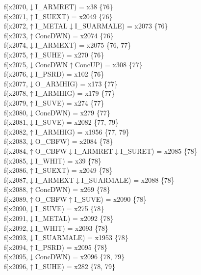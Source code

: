 f(x2070,$\downarrow$I\_ARMRET) = x38 \{76\} \\  
f(x2071,$\uparrow$I\_SUEXT) = x2049 \{76\} \\  
f(x2072,$\uparrow$I\_METAL$\downarrow$I\_SUARMALE) = x2073 \{76\} \\  
f(x2073,$\uparrow$ConcDWN) = x2074 \{76\} \\  
f(x2074,$\downarrow$I\_ARMEXT) = x2075 \{76, 77\} \\  
f(x2075,$\uparrow$I\_SUHE) = x270 \{76\} \\  
f(x2075,$\downarrow$ConcDWN$\uparrow$ConcUP) = x308 \{77\} \\  
f(x2076,$\downarrow$I\_PSRD) = x102 \{76\} \\  
f(x2077,$\downarrow$O\_ARMHIG) = x173 \{77\} \\  
f(x2078,$\uparrow$I\_ARMHIG) = x179 \{77\} \\  
f(x2079,$\uparrow$I\_SUVE) = x274 \{77\} \\  
f(x2080,$\downarrow$ConcDWN) = x279 \{77\} \\  
f(x2081,$\downarrow$I\_SUVE) = x2082 \{77, 79\} \\  
f(x2082,$\uparrow$I\_ARMHIG) = x1956 \{77, 79\} \\  
f(x2083,$\downarrow$O\_CBFW) = x2084 \{78\} \\  
f(x2084,$\uparrow$O\_CBFW$\downarrow$I\_ARMRET$\downarrow$I\_SURET) = x2085 \{78\} \\  
f(x2085,$\downarrow$I\_WHIT) = x39 \{78\} \\  
f(x2086,$\uparrow$I\_SUEXT) = x2049 \{78\} \\  
f(x2087,$\downarrow$I\_ARMEXT$\downarrow$I\_SUARMALE) = x2088 \{78\} \\  
f(x2088,$\uparrow$ConcDWN) = x269 \{78\} \\  
f(x2089,$\uparrow$O\_CBFW$\uparrow$I\_SUVE) = x2090 \{78\} \\  
f(x2090,$\downarrow$I\_SUVE) = x275 \{78\} \\  
f(x2091,$\downarrow$I\_METAL) = x2092 \{78\} \\  
f(x2092,$\downarrow$I\_WHIT) = x2093 \{78\} \\  
f(x2093,$\downarrow$I\_SUARMALE) = x1953 \{78\} \\  
f(x2094,$\uparrow$I\_PSRD) = x2095 \{78\} \\  
f(x2095,$\downarrow$ConcDWN) = x2096 \{78, 79\} \\  
f(x2096,$\uparrow$I\_SUHE) = x282 \{78, 79\} \\  
